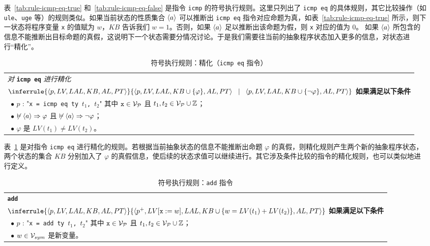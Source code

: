 表~\ref{tab:rule-icmp-eq-true} 和~\ref{tab:rule-icmp-eq-false} 是指令 \verb|icmp| 的符号执行规则。这里只列出了 \verb|icmp eq| 的具体规则，其它比较操作（如 \verb|ule|、\verb|uge| 等）的规则类似。如果当前状态的性质集合 $\langle a\rangle$ 可以推断出 \verb|icmp eq| 指令对应命题为真，如表~\ref{tab:rule-icmp-eq-true} 所示，则下一状态将程序变量 \verb|x| 的值赋为 $w$，$KB$ 告诉我们 $w=1$。否则，如果 $\langle a\rangle$ 足以推断出该命题为假，则 \verb|x| 对应的值为 0。
如果 $\langle a\rangle$ 所包含的信息不能推断出目标命题的真假，这说明下一个状态需要分情况讨论。于是我们需要往当前的抽象程序状态加入更多的信息，对状态进行“精化”。

\begin{table}[htbp]
\caption{符号执行规则：精化（\texttt{icmp eq} 指令）}
\label{tab:rule-refine-icmp-eq}
\begin{tabularx}{\textwidth}{|X|}
\hline
\emph{对} \textbf{\texttt{icmp eq}} \emph{进行精化}  \\
{\centering $
\inferrule
   {\lb p, LV, LAL, KB, AL, PT\rb}
   {\lb p, LV, LAL, KB\cup\{\varphi\}, AL, PT\rb \;\;\mid\;\; \lb p, LV, LAL, KB\cup\{\lnot\varphi\}, AL, PT\rb}
$ \\}
\textbf{如果满足以下条件} \\
~$\bullet$ $p$ : "\texttt{x = icmp eq ty $t_1$, $t_2$}" 其中 $\texttt{x}\in\mathcal{V}_{\mathcal{P}}$ 且 $t_1,t_2\in\mathcal{V}_{\mathcal{P}}\cup\mathbb{Z}$； \\
~$\bullet$ $\not\vDash \langle a\rangle \Rightarrow \varphi$ 且 $\not\vDash \langle a\rangle \Rightarrow \lnot\varphi$； \\
~$\bullet$ $\varphi$ 是 $LV(t_1) \not= LV(t_2)$。 \\
\hline
\end{tabularx}
\end{table}

表~\ref{tab:rule-refine-icmp-eq} 是对指令 \verb|icmp eq| 进行精化的规则。若根据当前抽象状态的信息不能推断出命题 $\varphi$ 的真假，则精化规则产生两个新的抽象程序状态，两个状态的集合 $KB$ 分别加入了 $\varphi$ 的真假信息，使后续的状态求值可以继续进行。其它涉及条件比较的指令的精化规则，也可以类似地进行定义。

\begin{table}[htbp]
\caption{符号执行规则：\texttt{add} 指令}
\label{tab:rule-add}
\begin{tabularx}{\textwidth}{|X|}
\hline
\textbf{\texttt{add}} \\
{\centering $
\inferrule
   {\lb p, LV, LAL, KB, AL, PT\rb}
   {\lb p^+, LV[\texttt{x} := w], LAL, KB\cup\{w= LV(t_1) + LV(t_2)\}, AL, PT\rb} 
$ \\}
\textbf{如果满足以下条件} \\
~$\bullet$ $p$ : "\texttt{x = add ty $t_1$, $t_2$}" 其中 $\texttt{x}\in\mathcal{V}_{\mathcal{P}}$ 且 $t_1,t_2\in\mathcal{V}_{\mathcal{P}}\cup\mathbb{Z}$； \\
~$\bullet$ $w\in\mathcal{V}_{sym}$ 是新变量。 \\
\hline
\end{tabularx}
\end{table}

